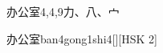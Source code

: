 \begin{entry}{办公室}{4,4,9}{⼒、⼋、⼧}
  \begin{phonetics}{办公室}{ban4gong1shi4}[][HSK 2]
  \end{phonetics}
\end{entry}
